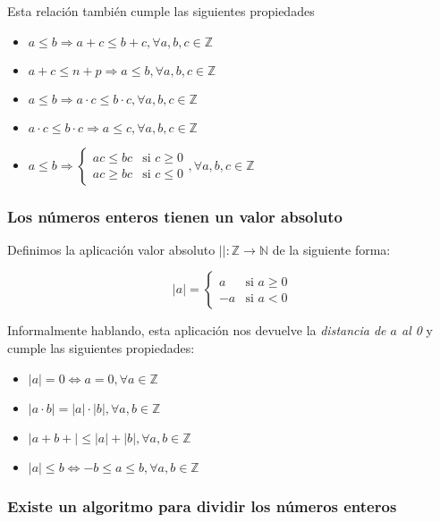 Esta relación también cumple las siguientes propiedades

\begin{itemize}
	\item $a \leq b \Rightarrow a+c \leq b+c, \forall a,b,c \in\mathbb{Z}$
	\item $a+c \leq n+p \Rightarrow a \leq b, \forall a,b,c \in\mathbb{Z}$
	\item $a \leq b \Rightarrow a \cdot c \leq b \cdot c, \forall a,b,c \in\mathbb{Z}$
	\item $a \cdot c \leq b \cdot c \Rightarrow a \leq c, \forall a,b,c \in\mathbb{Z}$
	\item $a \leq b \Rightarrow
		\begin{cases}
			ac \leq bc & \text{si } c \geq 0 \\
			ac \geq bc & \text{si } c \leq 0
		\end{cases}
		, \forall a,b,c \in\mathbb{Z}$
\end{itemize}

\subsubsection{Los números enteros tienen un valor absoluto}

Definimos la aplicación valor absoluto $|| : \mathbb{Z} \rightarrow \mathbb{N}$ de la siguiente forma:

\[
|a| =
\begin{cases}
	a  & \text{si } a \geq 0 \\
	-a & \text{si } a < 0
\end{cases}
\]

Informalmente hablando, esta aplicación nos devuelve la \textit{distancia de $a$ al 0} y cumple las siguientes propiedades:

\begin{itemize}
	\item $|a| = 0 \Leftrightarrow a = 0, \forall a \in\mathbb{Z}$
	\item $|a \cdot b| = |a| \cdot |b|, \forall a,b \in\mathbb{Z}$
	\item $|a+b+| \leq |a| + |b|, \forall a,b \in\mathbb{Z}$
	\item $|a| \leq b \Leftrightarrow -b \leq a \leq b, \forall a,b \in\mathbb{Z}$
\end{itemize}

\subsubsection{Existe un algoritmo para dividir los números enteros}

